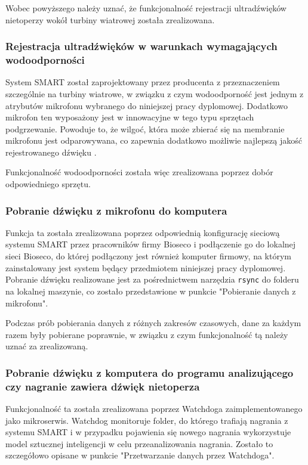 \documentclass{sprz}
\begin{document}
Wobec powyższego należy uznać, że funkcjonalność rejestracji ultradźwięków nietoperzy wokół turbiny wiatrowej została zrealizowana.


\subsubsection{Rejestracja ultradźwięków w warunkach wymagających wodoodporności}
System SMART został zaprojektowany przez producenta z przeznaczeniem szczególnie na turbiny wiatrowe, w związku z czym wodoodporność jest jednym z atrybutów mikrofonu wybranego do niniejszej pracy dyplomowej. Dodatkowo mikrofon ten wyposażony jest w innowacyjne w tego typu sprzętach podgrzewanie. Powoduje to, że wilgoć, która może zbierać się na membranie mikrofonu jest odparowywana, co zapewnia dodatkowo możliwie najlepszą jakość rejestrowanego dźwięku \cite{smart-user-guide}. 


Funkcjonalność wodoodporności została więc zrealizowana poprzez dobór odpowiedniego sprzętu.

\subsubsection{Pobranie dźwięku z mikrofonu do komputera}
Funkcja ta została zrealizowana poprzez odpowiednią konfigurację sieciową systemu SMART przez pracowników firmy Bioseco i podłączenie go do lokalnej sieci Bioseco, do której podłączony jest również komputer firmowy, na którym zainstalowany jest system będący przedmiotem niniejszej pracy dyplomowej. Pobranie dźwięku realizowane jest za pośrednictwem narzędzia \verb|rsync| do folderu na lokalnej maszynie, co zostało przedstawione w punkcie "Pobieranie danych z mikrofonu". 


Podczas prób pobierania danych z różnych zakresów czasowych, dane za każdym razem były pobierane poprawnie, w związku z czym funkcjonalność tą należy uznać za zrealizowaną.

\subsubsection{Pobranie dźwięku z komputera do programu analizującego czy nagranie zawiera dźwięk nietoperza}
Funkcjonalność ta została zrealizowana poprzez Watchdoga zaimplementowanego jako mikroserwis. Watchdog monitoruje folder, do którego trafiają nagrania z systemu SMART i w przypadku pojawienia się nowego nagrania wykorzystuje model sztucznej inteligencji w celu przeanalizowania nagrania. Zostało to szczegółowo opisane w punkcie "Przetwarzanie danych przez Watchdoga". 
\end{document}
